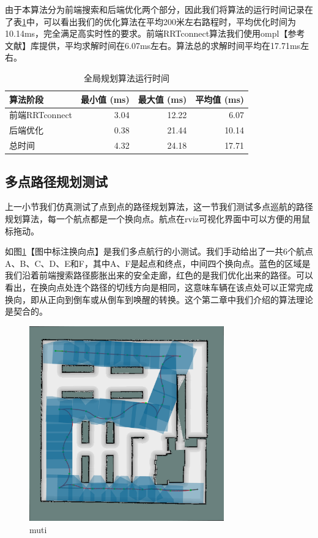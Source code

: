 \documentclass[master,academic]{ysuthesis} %
\begin{document}
		由于本算法分为前端搜索和后端优化两个部分，因此我们将算法的运行时间记录在了表\ref{tab:global_planning_time}中，可以看出我们的优化算法在平均200米左右路程时，平均优化时间为10.14ms，完全满足高实时性的要求。前端RRTconnect算法我们使用ompl【参考文献】库提供，平均求解时间在6.07ms左右。算法总的求解时间平均在17.71ms左右。
		\begin{table}[!ht]
			\caption{全局规划算法运行时间}
			\label{tab:global_planning_time}
			\centering
			\begin{tabular}{l rrr}
				\toprule
				算法阶段   & 最小值 (ms) & 最大值 (ms) & 平均值 (ms) \\
				\midrule
				前端RRTconnect & 3.04    & 12.22   & 6.07       \\
				后端优化       & 0.38    & 21.44    & 10.14      \\
				总时间         & 4.32    & 24.18    & 17.71      \\
				\bottomrule
			\end{tabular}
		\end{table}

		\subsection{多点路径规划测试}
		上一小节我们仿真测试了点到点的路径规划算法，这一节我们测试多点巡航的路径规划算法，每一个航点都是一个换向点。航点在rviz可视化界面中可以方便的用鼠标拖动。

		如图\ref{fig:muti}【图中标注换向点】是我们多点航行的小测试。我们手动给出了一共6个航点A、B、C、D、E和F，其中A、F是起点和终点，中间四个换向点。蓝色的区域是我们沿着前端搜索路径膨胀出来的安全走廊，红色的是我们优化出来的路径。可以看出，在换向点处连个路径的切线方向是相同，这意味车辆在该点处可以正常完成换向，即从正向到倒车或从倒车到唤醒的转换。这个第二章中我们介绍的算法理论是契合的。
		\begin{figure}[!ht]
			\centering
			\includegraphics[width=0.75\textwidth]{muti.png}
			\caption{muti}
			\label{fig:muti}
		\end{figure}
\end{document}
